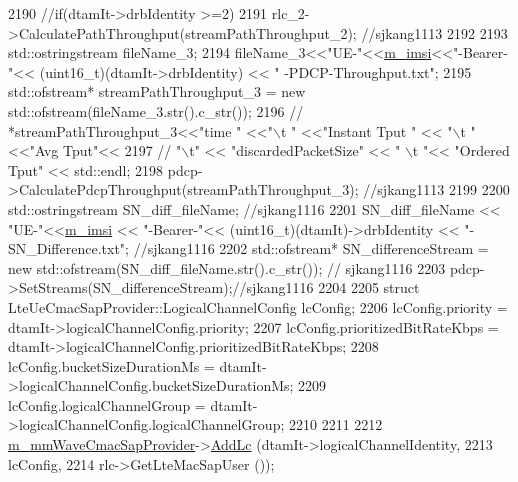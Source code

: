 \begin{DoxyCode}
2190                 \textcolor{comment}{//if(dtamIt->drbIdentity >=2)}
2191                 rlc\_2->CalculatePathThroughput(streamPathThroughput\_2); \textcolor{comment}{//sjkang1113}
2192 
2193                 std::ostringstream fileName\_3;
2194                 fileName\_3<<\textcolor{stringliteral}{"UE-"}<<\hyperlink{classns3_1_1LteUeRrc_a1d825677309d17bdf729920f7dafd011}{m\_imsi}<<\textcolor{stringliteral}{"-Bearer-"}<< (uint16\_t)(dtamIt->drbIdentity) << \textcolor{stringliteral}{"
      -PDCP-Throughput.txt"};
2195                 std::ofstream* streamPathThroughput\_3 = \textcolor{keyword}{new} std::ofstream(fileName\_3.str().c\_str());
2196              \textcolor{comment}{//   *streamPathThroughput\_3<<"time " <<"\(\backslash\)t " <<"Instant Tput " << "\(\backslash\)t " <<"Avg Tput"<<}
2197               \textcolor{comment}{//                "\(\backslash\)t" << "discardedPacketSize" << " \(\backslash\)t "<< "Ordered Tput" << std::endl;}
2198                 pdcp->CalculatePdcpThroughput(streamPathThroughput\_3); \textcolor{comment}{//sjkang1113}
2199 
2200                 std::ostringstream SN\_diff\_fileName; \textcolor{comment}{//sjkang1116}
2201                 SN\_diff\_fileName << \textcolor{stringliteral}{"UE-"}<<\hyperlink{classns3_1_1LteUeRrc_a1d825677309d17bdf729920f7dafd011}{m\_imsi} << \textcolor{stringliteral}{"-Bearer-"}<< (uint16\_t)(dtamIt)->drbIdentity << \textcolor{stringliteral}{
      "-SN\_Difference.txt"}; \textcolor{comment}{//sjkang1116}
2202                 std::ofstream* SN\_differenceStream = \textcolor{keyword}{new} std::ofstream(SN\_diff\_fileName.str().c\_str()); \textcolor{comment}{//
      sjkang1116}
2203                 pdcp->SetStreams(SN\_differenceStream);\textcolor{comment}{//sjkang1116}
2204 
2205               \textcolor{keyword}{struct }LteUeCmacSapProvider::LogicalChannelConfig lcConfig;
2206               lcConfig.priority = dtamIt->logicalChannelConfig.priority;
2207               lcConfig.prioritizedBitRateKbps = dtamIt->logicalChannelConfig.prioritizedBitRateKbps;
2208               lcConfig.bucketSizeDurationMs = dtamIt->logicalChannelConfig.bucketSizeDurationMs;
2209               lcConfig.logicalChannelGroup = dtamIt->logicalChannelConfig.logicalChannelGroup;      
2210 
2211 
2212               \hyperlink{classns3_1_1LteUeRrc_ac48418b0f235043204868e73c073ec0b}{m\_mmWaveCmacSapProvider}->\hyperlink{classns3_1_1LteUeCmacSapProvider_a62f2d731c336ca14e98e95a3215e92ec}{AddLc} (dtamIt->logicalChannelIdentity, 
2213                                       lcConfig,
2214                                       rlc->GetLteMacSapUser ());

\end{DoxyCode}
